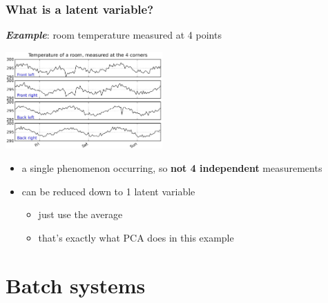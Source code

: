 \begin{frame}\frametitle{What is a latent variable?}

	\textbf{\emph{Example}}: room temperature measured at 4 points
	
	\begin{center}
		\includegraphics[width=6cm]{images/room-temperature-plots.jpg}
	\end{center}
	
	\begin{itemize}
		\item	a single phenomenon occurring, so \textbf{not 4 independent}  measurements
		
		\item	can be reduced down to 1 latent variable
		
				\begin{itemize}
					\item	just use the average
					
					\item	that's exactly what PCA does in this example
				\end{itemize}
		
	\end{itemize}
	
	

\end{frame}

\section{Batch systems}

